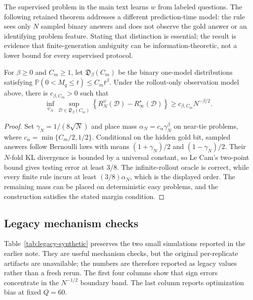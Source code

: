 The supervised problem in the main text learns \(w\) from labeled questions.
The following retained theorem addresses a different prediction-time model:
the rule sees only \(N\) sampled binary answers and does not observe the gold
answer or an identifying problem feature.  Stating that distinction is
essential; the result is evidence that finite-generation ambiguity can be
information-theoretic, not a lower bound for every supervised protocol.

\begin{theorem}
\label{thm:legacy-rollout-lower}
For \(\beta\ge0\) and \(C_m\ge1\), let
\(\mathfrak D_\beta(C_m)\) be the binary one-model distributions satisfying
\(\mathbb P(0<M_q\le t)\le C_m t^\beta\).  Under the rollout-only observation
model above, there is \(c_{\beta,C_m}>0\) such that
\[
\inf_{\psi_N}\sup_{\mathcal D\in\mathfrak D_\beta(C_m)}
\left\{
R_N^{\psi}(\mathcal D)-R_\infty^\star(\mathcal D)
\right\}
\ge c_{\beta,C_m}N^{-\beta/2}.
\]
\end{theorem}

\begin{proof}
Set \(\gamma_N=1/(8\sqrt N)\) and place mass
\(\alpha_N=c_\alpha\gamma_N^\beta\) on near-tie problems, where
\(c_\alpha=\min\{C_m/2,1/2\}\).  Conditional on the hidden gold bit, sampled
answers follow Bernoulli laws with means \((1+\gamma_N)/2\) and
\((1-\gamma_N)/2\).  Their \(N\)-fold KL divergence is bounded by a universal
constant, so Le Cam's two-point bound gives testing error at least \(3/8\).
The infinite-rollout oracle is correct, while every finite rule incurs at
least \((3/8)\alpha_N\), which is the displayed order.  The remaining mass can
be placed on deterministic easy problems, and the construction satisfies the
stated margin condition.
\end{proof}

\subsection{Legacy mechanism checks}
\label{app:legacy-synthetic}

Table~\ref{tab:legacy-synthetic} preserves the two small simulations reported
in the earlier note.  They are useful mechanism checks, but the original
per-replicate artifacts are unavailable; the numbers are therefore reported as
legacy values rather than a fresh rerun.  The first four columns show that
sign errors concentrate in the \(N^{-1/2}\) boundary band.  The last column
reports optimization bias at fixed \(Q=60\).

